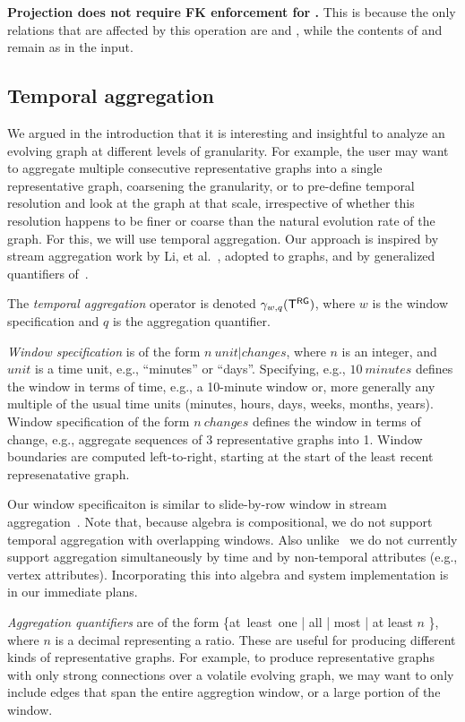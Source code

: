 {\bf Projection does not require FK enforcement for \tve.}  This is
because the only relations that are affected by this operation are
\tav and \tae, while the contents of \tv and \te remain as in the
input.

\subsection{Temporal aggregation}
\label{sec:algebra:agg}

We argued in the introduction that it is interesting and insightful to
analyze an evolving graph at different levels of granularity.  For
example, the user may want to aggregate multiple consecutive
representative graphs into a single representative graph, coarsening
the granularity, or to pre-define temporal resolution and look at the
graph at that scale, irrespective of whether this resolution happens
to be finer or coarse than the natural evolution rate of the graph.
For this, we will use temporal aggregation.  Our approach is inspired
by stream aggregation work by Li, et al.~\cite{Li2005}, adopted to
graphs, and by generalized quantifiers of~\cite{Hsu1995}.

The {\em temporal aggregation} operator is denoted $\gamma_{w,q}
(\mathsf{T^{RG}})$, where $w$ is the window specification and $q$ is the
aggregation quantifier.  

{\em Window specification} is of the form $n~{unit|changes}$, where
$n$ is an integer, and $unit$ is a time unit, e.g., ``minutes'' or
``days''.  Specifying, e.g., $10~minutes$ defines the window in terms
of time, e.g., a 10-minute window or, more generally any multiple of
the usual time units (minutes, hours, days, weeks, months, years).
Window specification of the form $n~changes$ defines the window in
terms of change, e.g., aggregate sequences of 3 representative graphs
into 1.  Window boundaries are computed left-to-right, starting at the
start of the least recent represenatative graph.

Our window specificaiton is similar to slide-by-row window in stream
aggregation~\cite{Li2005}.  Note that, because \tg algebra is
compositional, we do not support temporal aggregation with overlapping
windows. Also unlike~\cite{Li2005} we do not currently support
aggregation simultaneously by time and by non-temporal attributes
(e.g., vertex attributes). Incorporating this into \tg algebra and
system implementation is in our immediate plans.

{\em Aggregation quantifiers} are of the form \{at\ least\ one | all |
most | at least $n$ \}, where $n$ is a decimal representing a ratio.
      These are useful for producing different kinds of representative
      graphs.  For example, to produce representative graphs with only
      strong connections over a volatile evolving graph, we may want
      to only include edges that span the entire aggregtion window, or
      a large portion of the window.  

